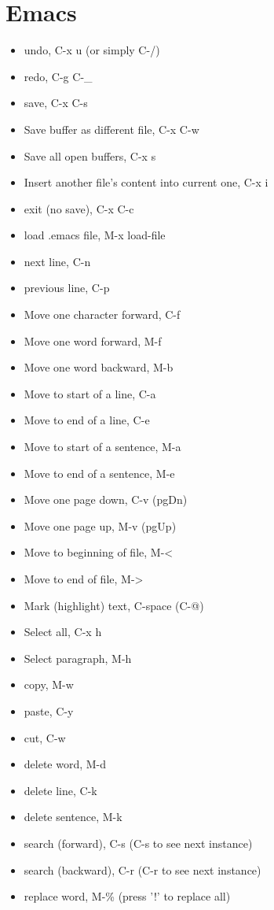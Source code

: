 \documentclass[11pt]{article}
\begin{document}
\section{Emacs}
\label{sec:orgb592fc3}
\begin{itemize}
\item undo, C-x u (or simply C-/)
\item redo, C-g C-\_
\item save, C-x C-s
\item Save buffer as different file, C-x C-w
\item Save all open buffers, C-x s
\item Insert another file's content into current one, C-x i
\item exit (no save), C-x C-c
\item load .emacs file, M-x load-file
\item next line, C-n
\item previous line, C-p
\item Move one character forward, C-f
\item Move one word forward, M-f
\item Move one word backward, M-b
\item Move to start of a line, C-a
\item Move to end of a line, C-e
\item Move to start of a sentence, M-a
\item Move to end of a sentence, M-e
\item Move one page down, C-v (pgDn)
\item Move one page up, M-v (pgUp)
\item Move to beginning of file, M-<
\item Move to end of file, M->
\item Mark (highlight) text, C-space (C-@)
\item Select all, C-x h
\item Select paragraph, M-h
\item copy, M-w
\item paste, C-y
\item cut, C-w
\item delete word, M-d
\item delete line, C-k
\item delete sentence, M-k
\item search (forward), C-s (C-s to see next instance)
\item search (backward), C-r (C-r to see next instance)
\item replace word, M-\% (press '!' to replace all)

\end{itemize}
\end{document}
